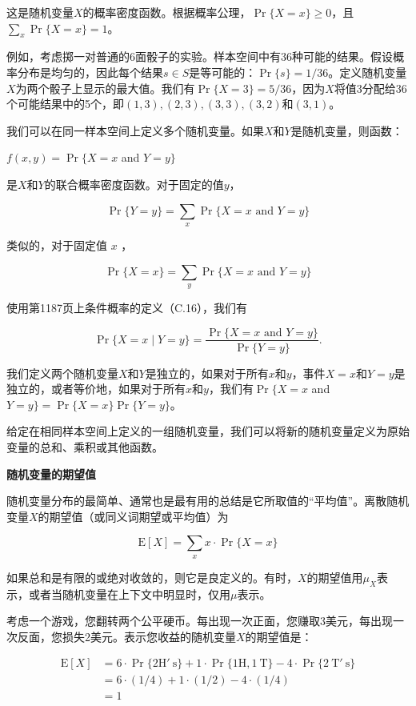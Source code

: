\documentclass[lang=cn,newtx,10pt,scheme=chinese]{elegantbook}
\begin{document}
这是随机变量$X$的概率密度函数。根据概率公理，$\operatorname{Pr}\{X=x\} \geq 0$，且$\sum_x \operatorname{Pr}\{X=x\}=1$。

例如，考虑掷一对普通的6面骰子的实验。样本空间中有36种可能的结果。假设概率分布是均匀的，因此每个结果$s \in S$是等可能的：$\operatorname{Pr}\{s\}=1 / 36$。定义随机变量$X$为两个骰子上显示的最大值。我们有$\operatorname{Pr}\{X=3\}=5 / 36$，因为$X$将值3分配给36个可能结果中的5个，即$(1,3),(2,3),(3,3),(3,2)$和$(3,1)$。

我们可以在同一样本空间上定义多个随机变量。如果$X$和$Y$是随机变量，则函数：

$f(x, y)=\operatorname{Pr}\{X=x$ and $Y=y\}$

是$X$和$Y$的联合概率密度函数。对于固定的值$y$，

$$
\operatorname{Pr}\{Y=y\}=\sum_x \operatorname{Pr}\{X=x \text { and } Y=y\}
$$

类似的，对于固定值 $x$ ，

$$
\operatorname{Pr}\{X=x\}=\sum_y \operatorname{Pr}\{X=x \text { and } Y=y\}
$$

使用第1187页上条件概率的定义（C.16），我们有

$$
\operatorname{Pr}\{X=x \mid Y=y\}=\frac{\operatorname{Pr}\{X=x \text { and } Y=y\}}{\operatorname{Pr}\{Y=y\}} .
$$

我们定义两个随机变量$X$和$Y$是独立的，如果对于所有$x$和$y$，事件$X=x$和$Y=y$是独立的，或者等价地，如果对于所有$x$和$y$，我们有$\operatorname{Pr}\{X=x$ and $Y=y\}=\operatorname{Pr}\{X=x\} \operatorname{Pr}\{Y=y\}$。

给定在相同样本空间上定义的一组随机变量，我们可以将新的随机变量定义为原始变量的总和、乘积或其他函数。

\textbf{随机变量的期望值}

随机变量分布的最简单、通常也是最有用的总结是它所取值的“平均值”。离散随机变量$X$的期望值（或同义词期望或平均值）为

$$
\mathrm{E}[X]=\sum_x x \cdot \operatorname{Pr}\{X=x\}
$$

如果总和是有限的或绝对收敛的，则它是良定义的。有时，$X$的期望值用$\mu_X$表示，或者当随机变量在上下文中明显时，仅用$\mu$表示。

考虑一个游戏，您翻转两个公平硬币。每出现一次正面，您赚取3美元，每出现一次反面，您损失2美元。表示您收益的随机变量$X$的期望值是：

$$
\begin{aligned}
\mathrm{E}[X] & =6 \cdot \operatorname{Pr}\{2 \mathrm{H} ' \mathrm{~s}\}+1 \cdot \operatorname{Pr}\{1 \mathrm{H}, 1 \mathrm{~T}\}-4 \cdot \operatorname{Pr}\{2 \mathrm{~T} ' \mathrm{~s}\} \\
& =6 \cdot(1 / 4)+1 \cdot(1 / 2)-4 \cdot(1 / 4) \\
& =1
\end{aligned}
$$
\end{document}
